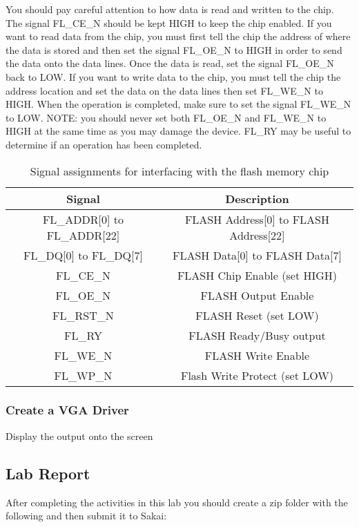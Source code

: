 You should pay careful attention to how data is read and written to the chip. The signal FL\_CE\_N should be kept HIGH to keep the chip enabled. If you want to read data from the chip, you must first tell the chip the address of where the data is stored and then set the signal FL\_OE\_N to HIGH in order to send the data onto the data lines. Once the data is read, set the signal FL\_OE\_N back to LOW. If you want to write data to the chip, you must tell the chip the address location and set the data on the data lines then set FL\_WE\_N to HIGH. When the operation is completed, make sure to set the signal FL\_WE\_N to LOW. NOTE: you should never set both FL\_OE\_N and FL\_WE\_N to HIGH at the same time as you may damage the device. FL\_RY may be useful to determine if an operation has been completed. 

\begin {table}[H]
	\caption {Signal assignments for interfacing with the flash memory chip} 
	\label{tab:flash} 
	\begin{center}
    		\begin{tabular}{ | c | c |}
			\hline
 			{\bf Signal} & {\bf Description} \\ \hline
			FL\_ADDR[0] to FL\_ADDR[22] & FLASH Address[0] to FLASH Address[22] \\ \hline
			FL\_DQ[0] to FL\_DQ[7] & FLASH Data[0] to FLASH Data[7] \\ \hline
			FL\_CE\_N & FLASH Chip Enable (set HIGH)\\ \hline
			FL\_OE\_N & FLASH Output Enable \\ \hline
			FL\_RST\_N & FLASH Reset (set LOW)\\ \hline
			FL\_RY & FLASH Ready/Busy output \\ \hline
			FL\_WE\_N & FLASH Write Enable \\ \hline
			FL\_WP\_N & Flash Write Protect (set LOW)\\ 
			\hline
    		\end{tabular}
	\end{center}
\end{table}

\subsubsection{Create a VGA Driver}
Display the output onto the screen

\subsection{Lab Report}
After completing the activities in this lab you should create a zip folder with the following and then submit it to Sakai:

